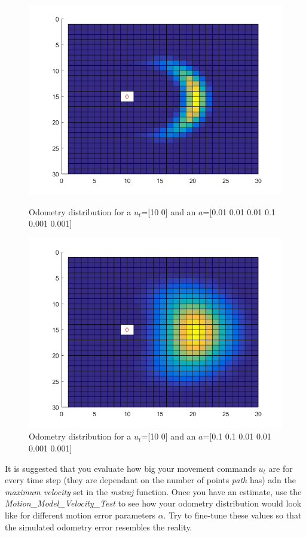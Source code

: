 \begin{figure}[h]
	\centering
	\begin{minipage}{.48\textwidth}
		\renewcommand\figurename{Fig.}
		\centering
		\includegraphics[width=0.95\linewidth]{figures/MotionModel_1}
		\caption{Odometry distribution for a $u_t$=[10 0] and an $a$=[0.01 0.01 0.01 0.1 0.001 0.001]}
	\end{minipage}%
	\hfill
	\begin{minipage}{.48\textwidth}
		\renewcommand\figurename{Fig.}
		\centering
		\includegraphics[width=0.95\linewidth]{figures/MotionModel_2}
		\caption{Odometry distribution for a $u_t$=[10 0] and an $a$=[0.1 0.1 0.01 0.01 0.001 0.001]}
	\end{minipage}%
\end{figure}

It is suggested that you evaluate how big your movement commands $u_t$ are for every time step (they are dependant on the number of points \textit{path} has) adn the \textit{maximum velocity} set in the \textit{mstraj} function. Once you have an estimate, use the \textit{Motion\_Model\_Velocity\_Test} to see how your odometry distribution would look like for different motion error parameters $\alpha$. Try to fine-tune these values so that the simulated odometry error resembles the reality.

